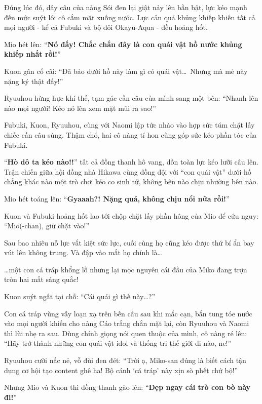 \documentclass[../main.tex]{subfiles}
\begin{document}
\ct

Đúng lúc đó, dây câu của nàng Sói đen lại giật nảy lên bần bật, lực kéo mạnh đến mức suýt lôi cô cắm mặt xuống nước. Lực cản quá khủng khiếp khiến tất cả mọi người - kể cả Fubuki và bộ đôi Okayu-Aqua - đều hoảng hốt.

Mio hét lên: ``\textbf{Nó đấy! Chắc chắn đây là con quái vật hồ nước khủng khiếp nhất rồi!}''

Kuon gân cổ cãi: ``Đã bảo dưới hồ này làm gì có quái vật\dots\ Nhưng mà mẻ này nặng ký thật đấy!''

Ryuuhou hừng hực khí thế, tạm gác cần câu của mình sang một bên: ``Nhanh lên nào mọi người! Kéo nó lên xem mặt mũi ra sao!''

Fubuki, Kuon, Ryuuhou, cùng với Naomi lập tức nhào vào hợp sức túm chặt lấy chiếc cần câu súng. Thậm chó, hai cô nàng tí hon cũng góp sức kéo phần tóc của Fubuki.

``\textbf{Hò dô ta kéo nào!!}'' tất cả đồng thanh hô vang, dồn toàn lực kéo lưỡi câu lên. Trận chiến giữa hội đồng nhà Hikawa cùng đồng đội với ``con quái vật'' dưới hồ chẳng khác nào một trò chơi kéo co sinh tử, không bên nào chịu nhường bên nào.


Mio hét toáng lên: ``\textbf{Gyaaah?! Nặng quá, không chịu nổi nữa rồi!}''

Kuon và Fubuki hoảng hốt lao tới chộp chặt lấy phần hông của Mio để cứu nguy: ``Mio(-chan), giữ chặt vào!''

Sau bao nhiêu nỗ lực vắt kiệt sức lực, cuối cùng họ cũng kéo được thứ bí ẩn bay vút lên không trung. Và đập vào mắt họ chính là\dots

\dots một con cá tráp khổng lồ nhưng lại mọc nguyên cái đầu của Miko đang trợn tròn hai mắt sáng quắc!


Kuon suýt ngất tại chỗ: ``Cái quái gì thế này\dots?''

Con cá tráp vùng vẫy loạn xạ trên bến cầu sau khi mắc cạn, bắn tung tóe nước vào mọi người khiến cho nàng Cáo trắng chắn mặt lại, còn Ryuuhou và Naomi thì lùi nhẹ ra sau. Dùng chính giọng nói quen thuộc của mình, cô nàng ré lên: ``Hãy trở thành những con quái vật idol và thống trị thế giới đi nào, ne!''

Ryuuhou cười nấc nẻ, vỗ đùi đen đét: ``Trời ạ, Miko-san đúng là biết cách tận dụng cơ hội tạo content ghê ha! Bộ cánh `cá tráp' này xịn sò phết chứ bộ!''

Nhưng Mio và Kuon thì đồng thanh gào lên: ``\textbf{Dẹp ngay cái trò con bò này đi!}''
\end{document}
